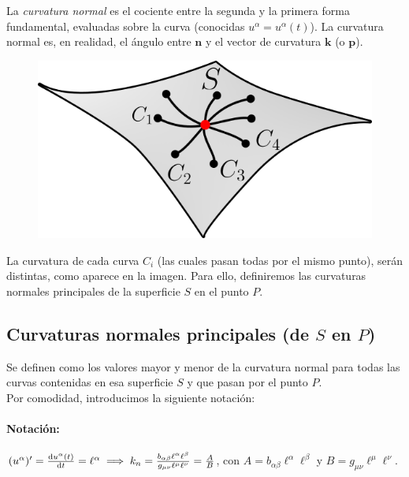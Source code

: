 La \emph{curvatura normal} es el cociente entre la segunda y la primera forma fundamental, evaluadas sobre la curva (conocidas $u^\alpha =u^\alpha (t)$). La curvatura normal es, en realidad, el ángulo entre $\mathbf{n}$ y el vector de curvatura $\mathbf{k}$ (o $\mathbf{p}$). \\
\newpage
\begin{figure}
    \centering
    \includegraphics[scale=.37]{FOTOS/curva_normal.png}
\end{figure}
La curvatura de cada curva $C_i$ (las cuales pasan todas por el mismo punto), serán distintas, como aparece en la imagen. Para ello, definiremos las curvaturas normales principales de la superficie $S$ en el punto $P$.\\

\subsection{Curvaturas normales principales (de $S$ en $P$)}
Se definen como los valores mayor y menor de la curvatura normal para todas las curvas contenidas en esa superficie $S$ y que pasan por el punto $P$.\\

Por comodidad, introducimos la siguiente notación:
\paragraph{Notación:} $(u^\alpha )'=\dv{u^\alpha (t)}{t}=\ell ^\alpha \implies k_n=\frac{b_{\alpha \beta }\ell ^\alpha \ell ^\beta }{g_{\mu \nu }\ell ^\mu \ell ^\nu }=\frac{A}{B}$, con $A=b_{\alpha \beta }\ell ^\alpha \ell ^\beta $ y $B=g_{\mu \nu} \ell ^\mu \ell ^\nu $.\\

